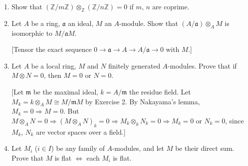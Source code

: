 \begin{enumerate}
\item Show that $(\mathbb Z/m\mathbb Z)\otimes_{\mathbb Z}(\mathbb Z/n\mathbb Z)=0$ if $m$, $n$ are coprime.

\item Let $A$ be a ring, $\mathfrak a$ an ideal, $M$ an $A$-module. Show that $(A/\mathfrak a)\otimes_A M$ is isomorphic to $M/\mathfrak aM$.

[Tensor the exact sequence $0\longrightarrow\mathfrak a\longrightarrow A\longrightarrow A/\mathfrak a\longrightarrow0$ with $M$.]

\item Let $A$ be a local ring, $M$ and $N$ finitely generated $A$-modules. Prove that if $M\otimes N=0$, then $M=0$ or $N=0$.

[Let $\mathfrak m$ be the maximal ideal, $k=A/\mathfrak m$ the residue field. Let $M_k=k\otimes_A M\cong M/\mathfrak mM$ by Exercise 2. By Nakayama's lemma, $M_k=0\Rightarrow M=0$. But $M\otimes_A N=0\Rightarrow(M\otimes_A N)_k=0\Rightarrow M_k\otimes_k N_k=0\Rightarrow M_k=0$ or $N_k=0$, since $M_k$, $N_k$ are vector spaces over a field.]

\item Let $M_i$ ($i\in I$) be any family of $A$-modules, and let $M$ be their direct sum. Prove that $M$ is flat $\Longleftrightarrow$ each $M_i$ is flat.
\end{enumerate}
